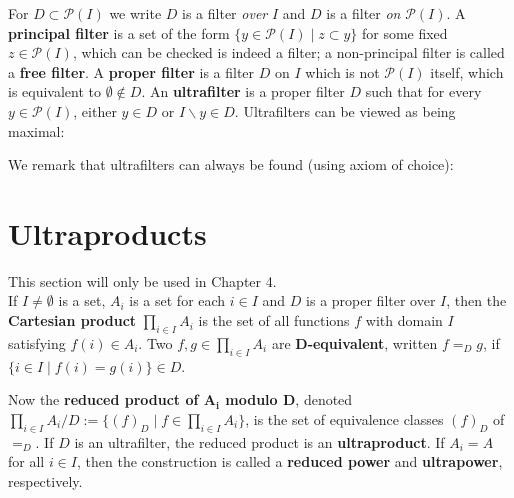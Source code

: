 For $D\subset\mathcal{P}(I)$ we write $D$ is a filter \textit{over} $I$ and $D$ is a filter \textit{on} $\mathcal{P}(I)$. A \textbf{principal filter} is a set of the form $\{y\in\mathcal{P}(I)\mid z\subset y\}$ for some fixed $z\in\mathcal{P}(I)$, which can be checked is indeed a filter; a non-principal filter is called a \textbf{free filter}. A \textbf{proper filter} is a filter $D$ on $I$ which is not $\mathcal{P}(I)$ itself, which is equivalent to $\emptyset\notin D$. An \textbf{ultrafilter} is a proper filter $D$ such that for every $y\in\mathcal{P}(I)$, either $y\in D$ or $I\backslash y\in D$. Ultrafilters can be viewed as being maximal:


We remark that ultrafilters can always be found (using axiom of choice):


\section{Ultraproducts}
This section will only be used in Chapter 4.\\

If $I\neq\emptyset$ is a set, $A_i$ is a set for each $i\in I$ and $D$ is a proper filter over $I$, then the \textbf{Cartesian product} $\prod_{i\in I}A_i$ is the set of all functions $f$ with domain $I$ satisfying $f(i)\in A_i$. Two $f,g\in\prod_{i\in I}A_i$ are \textbf{$\boldsymbol D$-equivalent}, written $f=_Dg$, if $\{i\in I\mid f(i)=g(i)\}\in D$.


Now the \textbf{reduced product of $\boldsymbol{A_i}$ modulo $\boldsymbol D$}, denoted $\prod_{i\in I}A_i/D:=\{(f)_D\mid f\in\prod_{i\in I}A_i\}$, is the set of equivalence classes $(f)_D$ of $=_D$. If $D$ is an ultrafilter, the reduced product is an \textbf{ultraproduct}. If $A_i=A$ for all $i\in I$, then the construction is called a \textbf{reduced power} and \textbf{ultrapower}, respectively.


